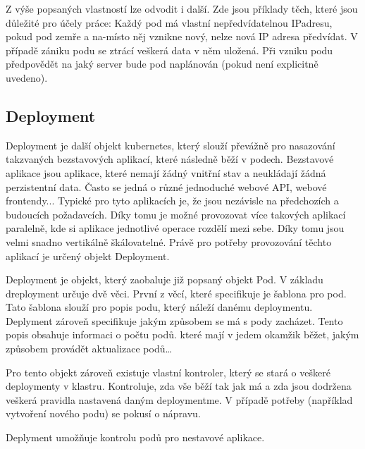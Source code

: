 Z výše popsaných vlastností lze odvodit i další. Zde jsou příklady těch, které jsou důležité pro účely práce: Každý pod má vlastní nepředvídatelnou IPadresu, pokud pod zemře a na-místo něj vznikne nový, nelze nová IP adresa předvídat. V případě zániku podu se ztrácí veškerá data v něm uložená. Při vzniku podu předpovědět na jaký server bude pod naplánován (pokud není explicitně uvedeno). 

\subsection{Deployment}
Deployment je další objekt kubernetes, který slouží převážně pro nasazování takzvaných bezstavových aplikací, které následně běží v podech. Bezstavové aplikace jsou aplikace, které nemají žádný vnitřní stav a neukládají žádná perzistentní data. Často se jedná o různé jednoduché webové API, webové frontendy... Typické pro tyto aplikacích je, že jsou nezávisle na předchozích a budoucích požadavcích. Díky tomu je možné provozovat více takových aplikací paralelně, kde si aplikace jednotlivé operace rozdělí mezi sebe. Díky tomu jsou velmi snadno vertikálně škálovatelné. Právě pro potřeby provozování těchto aplikací je určený objekt Deployment.

Deployment je objekt, který zaobaluje již popsaný objekt Pod. V základu dreployment určuje dvě věci. První z věcí, které specifikuje je šablona pro pod. Tato šablona slouží pro popis podu, který náleží danému deploymentu. Deplyment zároveň specifikuje jakým způsobem se má s pody zacházet. Tento popis obsahuje informaci o počtu podů. které mají v jedem okamžik běžet, jakým způsobem provádět aktualizace podů\ldots

Pro tento objekt zároveň existuje vlastní kontroler, který se stará o veškeré deploymenty v klastru. Kontroluje, zda vše běží tak jak má a zda jsou dodržena veškerá pravidla nastavená daným deploymentme. V případě potřeby (například vytvoření nového podu) se pokusí o nápravu.

Deplyment umožňuje kontrolu podů pro nestavové aplikace.